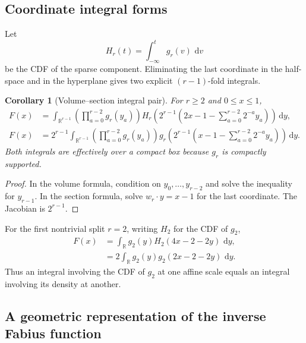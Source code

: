 \documentclass[11pt,oneside]{article}
\newtheorem{corollary}[theorem]{Corollary}
\theoremstyle{definition}
\newcommand{\dd}{\,\mathrm d}
\newcommand{\R}{\mathbb R}
\begin{document}
\subsection{Coordinate integral forms}

Let
\begin{equation}
 H_r(t)=\int_{-\infty}^{t}g_r(v)\,\dd v                    \label{p2:eq:Hr-cdf}
\end{equation}
be the CDF of the sparse component.  Eliminating the last coordinate in the
half-space and in the hyperplane gives two explicit $(r-1)$-fold integrals.

\begin{corollary}[Volume--section integral pair]
\label{p2:cor:coordinate-section}
For $r\ge2$ and $0\le x\le1$,
\begin{align}
 F(x)
 &=\int_{\R^{r-1}}
   \left(\prod_{a=0}^{r-2}g_r(y_a)\right)
   H_r\!\left(2^{r-1}\left(2x-1-
      \sum_{a=0}^{r-2}2^{-a}y_a\right)\right)\dd y,       \label{p2:eq:F-volume-coordinates}\\
 F(x)
 &=2^{r-1}\int_{\R^{r-1}}
   \left(\prod_{a=0}^{r-2}g_r(y_a)\right)
   g_r\!\left(2^{r-1}\left(x-1-
      \sum_{a=0}^{r-2}2^{-a}y_a\right)\right)\dd y.       \label{p2:eq:F-section-coordinates}
\end{align}
Both integrals are effectively over a compact box because $g_r$ is compactly
supported.
\end{corollary}

\begin{proof}
In the volume formula, condition on $y_0,\ldots,y_{r-2}$ and solve the inequality
for $y_{r-1}$.  In the section formula, solve
$w_r\cdot y=x-1$ for the last coordinate.  The Jacobian is $2^{r-1}$.
\end{proof}

For the first nontrivial split $r=2$, writing $H_2$ for the CDF of $g_2$,
\begin{align}
 F(x)
 &=\int_{\R}g_2(y)H_2(4x-2-2y)\,\dd y,                    \label{p2:eq:r2-volume}\\
 &=2\int_{\R}g_2(y)g_2(2x-2-2y)\,\dd y.                  \label{p2:eq:r2-section}
\end{align}
Thus an integral involving the CDF of $g_2$ at one affine scale equals an
integral involving its density at another.

\subsection{A geometric representation of the inverse Fabius function}
\end{document}
